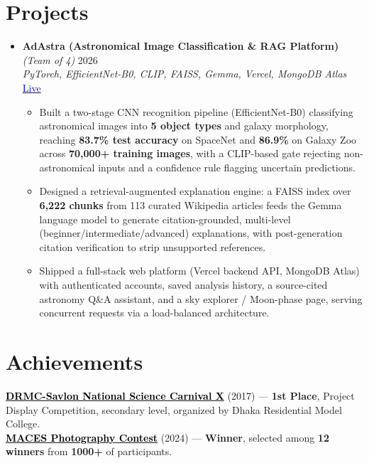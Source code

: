\documentclass[a4paper]{article}
\newcommand{\resumeItem}[1]{
  \item\small{
    {#1 \vspace{-2pt}}
  }
}
\newcommand{\resumeItemListStart}{\begin{itemize}}
\newcommand{\resumeItemListEnd}{\end{itemize}\vspace{-5pt}}
\begin{document}
\section{Projects}
  \begin{itemize}[leftmargin=0.15in, label={}, itemsep=6pt]

    \item
    \textbf{AdAstra (Astronomical Image Classification \& RAG Platform)} \textit{\small (Team of 4)} \hfill 2026\\
    \small\textit{PyTorch, EfficientNet-B0, CLIP, FAISS, Gemma, Vercel, MongoDB Atlas} \hfill
    \href{https://adastra-virid.vercel.app/}{\textcolor{blue}{Live}}
    \vspace{-5pt}
    \resumeItemListStart
      \resumeItem{Built a two-stage CNN recognition pipeline (EfficientNet-B0) classifying astronomical images into \textbf{5 object types} and galaxy morphology, reaching \textbf{83.7\% test accuracy} on SpaceNet and \textbf{86.9\%} on Galaxy Zoo across \textbf{70,000+ training images}, with a CLIP-based gate rejecting non-astronomical inputs and a confidence rule flagging uncertain predictions.}
      \resumeItem{Designed a retrieval-augmented explanation engine: a FAISS index over \textbf{6,222 chunks} from 113 curated Wikipedia articles feeds the Gemma language model to generate citation-grounded, multi-level (beginner/intermediate/advanced) explanations, with post-generation citation verification to strip unsupported references.}
      \resumeItem{Shipped a full-stack web platform (Vercel backend API, MongoDB Atlas) with authenticated accounts, saved analysis history, a source-cited astronomy Q\&A assistant, and a sky explorer / Moon-phase page, serving concurrent requests via a load-balanced architecture.}
    \resumeItemListEnd

  \end{itemize}




\section{Achievements}
 \begin{itemize}[leftmargin=0.15in, label={}]
    \small{\item{
    \href{https://drive.google.com/file/d/1R9-JI0GKXio1b9wWEBjO4GP55Cq6Ceed/view}{\textcolor{black}{\textbf{DRMC-Savlon National Science Carnival X}}} (2017) --- \textbf{1st Place}, Project Display Competition, secondary level, organized by Dhaka Residential Model College.\\
    \href{https://www.facebook.com/photo.php?fbid=750399813789368&id=100064580687607&set=a.481583907337628}{\textcolor{black}{\textbf{MACES Photography Contest}}} (2024) --- \textbf{Winner}, selected among \textbf{12 winners} from \textbf{1000+} of participants.
    }}
 \end{itemize}


\end{document}
